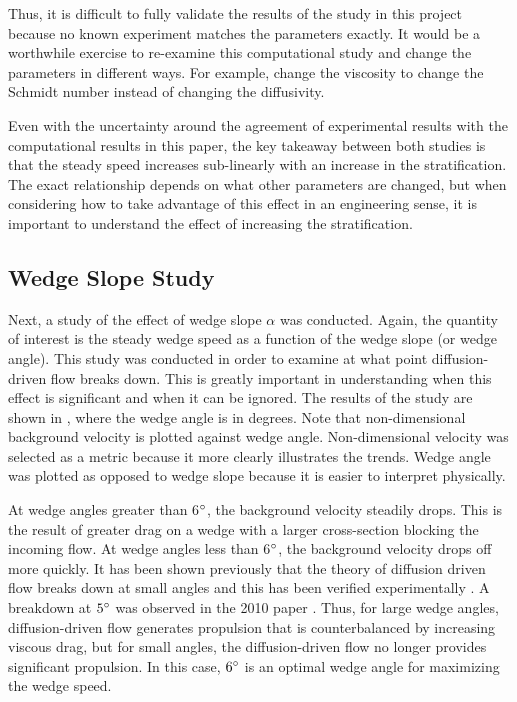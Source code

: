 \documentclass[12pt]{article}
\begin{document}
Thus, it is difficult to fully validate the results of the study in this project because 
no known experiment matches the parameters exactly. It would be a worthwhile exercise to re-examine this computational study and change the parameters in different ways. For example, change the viscosity to change the Schmidt number instead of changing the diffusivity.

Even with the uncertainty around the agreement of experimental results with the computational results in this paper, the key takeaway between both studies is that the steady speed increases sub-linearly with an increase in the stratification. The exact relationship depends on what other parameters are changed, but when considering how to take advantage of this effect in an engineering sense, it is important to understand the effect of increasing the stratification.


\subsection{Wedge Slope Study}

Next, a study of the effect of wedge slope $\alpha$ was conducted. Again, the quantity of interest is the steady wedge speed as a function of the wedge slope (or wedge angle). This study was conducted in order to examine at what point diffusion-driven flow breaks down. This is greatly important in understanding when this effect is significant and when it can be ignored. The results of the study are shown in , where the wedge angle is in degrees. Note that non-dimensional background velocity is plotted against wedge angle. Non-dimensional velocity was selected as a metric because it more clearly illustrates the trends. Wedge angle was plotted as opposed to wedge slope because it is easier to interpret physically.


At wedge angles greater than 6$\degree$, the background velocity steadily drops. This is the result of greater drag on a wedge with a larger cross-section blocking the incoming flow. At wedge angles less than 6$\degree$, the background velocity drops off more quickly. It has been shown previously that the theory of diffusion driven flow breaks down at small angles \cite{WUNSCH1970293} and this has been verified experimentally \cite{peacock2004experimental}. A breakdown at $5\degree$ was observed in the 2010 paper \cite{allshouse2010propulsion}. Thus, for large wedge angles, diffusion-driven flow generates propulsion that is counterbalanced by increasing viscous drag, but for small angles, the diffusion-driven flow no longer provides significant propulsion. In this case, $6\degree$ is an optimal wedge angle for maximizing the wedge speed.
\end{document}
